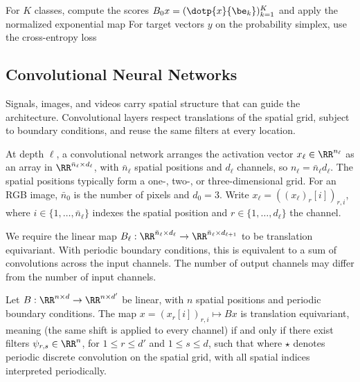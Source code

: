 For $K$ classes, compute the scores $B_0 x = (\dotp{x}{\be_k})_{k=1}^K$ and apply the normalized exponential map
For target vectors $y$ on the probability simplex, use the cross-entropy loss

\subsection{Convolutional Neural Networks}
\label{sec-cnn}

Signals, images, and videos carry spatial structure that can guide the architecture. Convolutional layers respect translations of the spatial grid, subject to boundary conditions, and reuse the same filters at every location.

At depth $\ell$, a convolutional network arranges the activation vector $x_\ell\in\RR^{n_\ell}$ as an array in $\RR^{\bar n_\ell\times d_\ell}$, with $\bar n_\ell$ spatial positions and $d_\ell$ channels, so $n_\ell=\bar n_\ell d_\ell$. The spatial positions typically form a one-, two-, or three-dimensional grid.
%
For an RGB image, $\bar n_0$ is the number of pixels and $d_0=3$.
%
Write $x_\ell = ( (x_\ell)_r[i] )_{r,i}$, where $i \in \{1,\ldots,\bar n_\ell\}$ indexes the spatial position and $r \in \{1,\ldots,d_\ell\}$ the channel.

We require the linear map $B_\ell:\RR^{\bar n_\ell\times d_\ell}\to\RR^{\bar n_\ell\times d_{\ell+1}}$ to be translation equivariant. With periodic boundary conditions, this is equivalent to a sum of convolutions across the input channels. The number of output channels may differ from the number of input channels.

\begin{prop}
	Let $B : \RR^{n \times d} \rightarrow \RR^{n \times d'}$ be linear, with $n$ spatial positions and periodic boundary conditions. The map $x = (x_r[i] )_{r,i} \mapsto B x$ is translation equivariant, meaning
	(the same shift is applied to every channel) if and only if there exist filters $\psi_{r,s}\in\RR^n$, for $1\leq r\leq d'$ and $1\leq s\leq d$, such that
	where $\star$ denotes periodic discrete convolution on the spatial grid, with all spatial indices interpreted periodically.
\end{prop}

